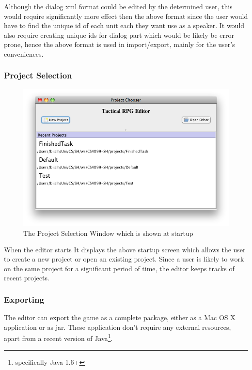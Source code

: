 Although the dialog xml format could be edited by the determined user, this would require significantly more effect then the above format since the user would have to find the unique id  of each unit each they want use as a speaker. It would also require creating unique ids for dialog part which would be likely be error prone, hence the above format is used in import/export, mainly for the user's conveniences.

\subsubsection{Project Selection}
\begin{figure}[htbp]
	\centering
		\includegraphics[width=1.05\textwidth]{figures/editor/Project_Selection.png}
	\caption{The Project Selection Window which is shown at startup}
	\label{fig:figures_editor_Project_Selection}
\end{figure}

When the editor starts It displays the above startup screen which allows the user to create a new project or open an existing project.  Since a user is likely to work on the same project for a significant period of time, the editor keeps tracks of recent projects. 

\clearpage
\subsubsection{Exporting}
\label{ssub:exporting}

The editor can export the game as a complete package, either as a Mac OS X application or as jar. These application don't require any external resources, apart from a recent version of Java\footnote{specifically Java 1.6+}.

